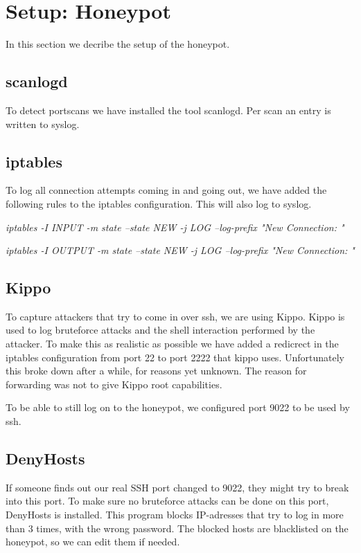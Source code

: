 \documentclass[11pt]{article} %
\begin{document}
\section{Setup: Honeypot}

In this section we decribe the setup of the honeypot.

\subsection{scanlogd}

To detect portscans we have installed the tool scanlogd.
Per scan an entry is written to syslog.

\subsection{iptables}
To log all connection attempts coming in and going out, we have added the following rules to the iptables configuration. 
This will also log to syslog.

\emph{iptables -I INPUT -m state --state NEW -j LOG --log-prefix "New Connection: "}

\emph{iptables -I OUTPUT -m state --state NEW -j LOG --log-prefix "New Connection: "}


\subsection{Kippo}
To capture attackers that try to come in over ssh, we are using Kippo. 
Kippo is used to log bruteforce attacks and the shell interaction performed by the attacker. 
To make this as realistic as possible we have added a redicrect in the iptables configuration from port 22 to port 2222 that kippo uses. 
Unfortunately this broke down after a while, for reasons yet unknown. 
The reason for forwarding was not to give Kippo root capabilities.

To be able to still log on to the honeypot, we configured port 9022 to be used by ssh.

\subsection{DenyHosts}
If someone finds out our real SSH port changed to 9022, they might try to break into this port. To make sure no bruteforce attacks can be done on this port, DenyHosts is installed. This program blocks IP-adresses that try to log in more than 3 times, with the wrong password. The blocked hosts are blacklisted on the honeypot, so we can edit them if needed.
\end{document}
